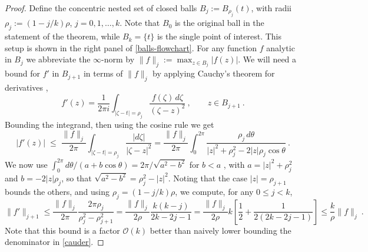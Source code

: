 \documentclass[10pt]{article}
\newcommand{\be}{\begin{equation}}
\newcommand{\ee}{\end{equation}}
\newcommand{\bigO}{{\mathcal O}}
\begin{document}
\begin{proof}
  Define the concentric nested set of closed balls $B_j := B_{\rho_j}(t)$,
  with radii $\rho_j := (1-j/k)\rho$, $j=0,1,\dots,k$. Note that
  $B_0$ is the original ball in the statement of the theorem, while
    $B_k = \{t\}$ is the single point of interest. This setup is shown in the
    right panel of \cref{balls-flowchart}.
  For any function $f$ analytic in $B_j$ we abbreviate the $\infty$-norm by
  $\|f\|_j := \max_{z \in B_j}|f(z)|$.
  We will need a bound for $f'$ in $B_{j+1}$ in terms of $\|f\|_j$ by
  applying Cauchy's theorem for derivatives
  \cite{steinshakarchi},
  \be
  f'(z) = \frac{1}{2\pi i} \int_{|\zeta-t|=\rho_j} \frac{f(\zeta)\, d\zeta}{(\zeta-z)^2}
  ~, \qquad z \in B_{j+1}~.
  \label{cauder}
  \ee
  Bounding the integrand, then using the cosine rule we get
  $$
  |f'(z)| \;\le \;
  \frac{\|f\|_j}{2\pi} \int_{|\zeta-t| = \rho_j} \frac{|d\zeta|}{|\zeta-z|^2}
  =
  \frac{\|f\|_j}{2\pi} \int_0^{2\pi} \frac{\rho_j\, d\theta}{|z|^2 + \rho_j^2 - 2|z|\rho_j \cos \theta}~.
  $$
  We now use $\int_{0}^{2\pi} d\theta /(a + b \cos \theta) = 2\pi/\sqrt{a^2-b^2}$
  for $b<a$ \cite[Eq.~3.613.1]{GR8}, with
  $a = |z|^2 + \rho_j^2$ and $b = -2|z|\rho_j$, so that
  $\sqrt{a^2-b^2} = \rho_j^2-|z|^2$.
  Noting that the case $|z| = \rho_{j+1}$ bounds the others,
  and using $\rho_j=(1-j/k)\rho$, we compute, for any $0\le j < k$,
  \be
  \|f'\|_{j+1} \le
  \frac{\|f\|_j}{2\pi} \frac{2\pi\rho_j}{\rho_j^2-\rho_{j+1}^2}
  =
  \frac{\|f\|_j}{2 \rho} \frac{k(k-j)}{2k-2j-1}
  =
  \frac{\|f\|_j}{2 \rho} k \left[ \frac{1}{2} + \frac{1}{2(2k-2j-1)}\right]
  \le
  \frac{k}{\rho}\|f\|_j~.
  \label{derbnd}
  \ee
  Note that this bound is a factor $\bigO(k)$ better than naively
  lower bounding the denominator in \cref{cauder}.
  

\end{proof}
\end{document}
